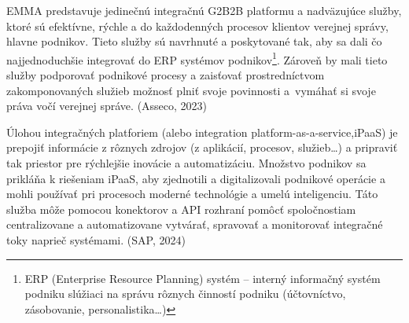 



EMMA predstavuje jedinečnú integračnú G2B2B platformu a nadväzujúce služby, ktoré sú efektívne, rýchle a  do každodenných procesov klientov verejnej správy, hlavne podnikov. Tieto služby sú navrhnuté a poskytované tak, aby sa dali čo najjednoduchšie integrovať do ERP systémov podnikov\footnote{ERP (Enterprise Resource Planning) systém -- interný informačný systém podniku slúžiaci na správu rôznych činností podniku (účtovníctvo, zásobovanie, personalistika\dots)}. Zároveň by mali tieto služby podporovať podnikové procesy a zaisťovať prostredníctvom zakomponovaných služieb možnosť plniť svoje povinnosti a~vymáhať si svoje práva vočí verejnej správe. \scr(Asseco, 2023)

Úlohou integračných platforiem (alebo integration platform-as-a-service,\zlom iPaaS) je prepojiť informácie z rôznych zdrojov (z aplikácií, procesov, služieb\dots) a pripraviť tak priestor pre rýchlejšie inovácie a automatizáciu. Množstvo podnikov sa prikláňa k riešeniam iPaaS, aby zjednotili a digitalizovali podnikové operácie a mohli používať pri procesoch moderné technológie a umelú inteligenciu. Táto služba môže pomocou konektorov a API rozhraní pomôcť spoločnostiam centralizovane a automatizovane vytvárať, spravovať a monitorovať integračné toky naprieč systémami. \scr(SAP, 2024)

